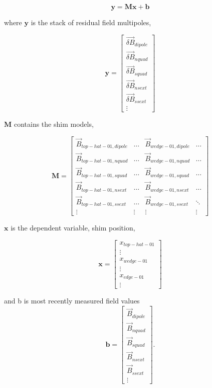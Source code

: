 \[
\mathbf{y} = \mathbf{M} \mathbf{x} + \mathbf{b}
\]

\noindent
where $\mathbf{y}$ is the stack of residual field multipoles, 

\[
\mathbf{y} = \begin{bmatrix}
\vec{\delta B}_{dipole} \\
\vec{\delta B}_{nquad} \\
\vec{\delta B}_{squad} \\
\vec{\delta B}_{nsext} \\ 
\vec{\delta B}_{ssext} \\
\vdots
\end{bmatrix}
\]

\noindent
$\mathbf{M}$ contains the shim models, 

\[
\mathbf{M} = \begin{bmatrix}
\vec{B}_{top-hat-01,dipole} & \hdots & \vec{B}_{wedge-01,dipole} & \hdots \\
\vec{B}_{top-hat-01,nquad}  & \hdots & \vec{B}_{wedge-01,nquad} & \hdots \\
\vec{B}_{top-hat-01,squad}  & \hdots & \vec{B}_{wedge-01,squad} & \hdots \\
\vec{B}_{top-hat-01,nsext}  & \hdots & \vec{B}_{wedge-01,nsext} & \hdots \\ 
\vec{B}_{top-hat-01,ssext}  & \hdots & \vec{B}_{wedge-01,ssext} & \ddots \\
\vdots & \vdots & \vdots & \vdots
\end{bmatrix}
\]

\noindent
$\mathbf{x}$ is the dependent variable, shim position, 

\[
\mathbf{x} = \begin{bmatrix}
x_{top-hat-01} \\
\vdots \\
x_{wedge-01} \\
\vdots \\
x_{edge-01} \\
\vdots
\end{bmatrix}
\]

\noindent
and b is most recently measured field values
\[
\mathbf{b} = \begin{bmatrix}
\vec{B}_{dipole} \\
\vec{B}_{nquad}  \\
\vec{B}_{squad}  \\
\vec{B}_{nsext}  \\ 
\vec{B}_{ssext}  \\
\vdots
\end{bmatrix}.
\]

